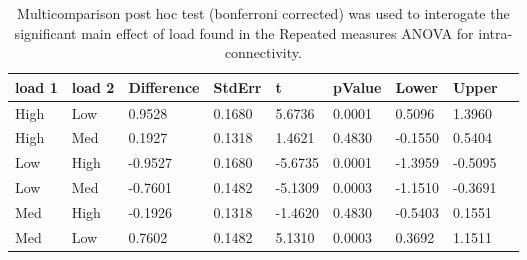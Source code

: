 \begin{table}
\centering
\begin{tabular}[0.2em]{@{}lllllllll@{}}\toprule
load 1 & load 2 & Difference & StdErr & t & pValue & Lower & Upper\\\toprule[0.2em]
High & Low & 0.9528 & 0.1680 & 5.6736 & 0.0001 & 0.5096 & 1.3960 \\\midrule
High & Med & 0.1927 & 0.1318 & 1.4621 & 0.4830 & -0.1550 & 0.5404 \\\midrule
Low & High & -0.9527 & 0.1680 & -5.6735 & 0.0001 & -1.3959 & -0.5095 \\\midrule
Low & Med & -0.7601 & 0.1482 & -5.1309 & 0.0003 & -1.1510 & -0.3691 \\\midrule
Med & High & -0.1926 & 0.1318 & -1.4620 & 0.4830 & -0.5403 & 0.1551 \\\midrule
Med & Low & 0.7602 & 0.1482 & 5.1310 & 0.0003 & 0.3692 & 1.1511 \\\bottomrule[0.2em]
\end{tabular}
\caption{Multicomparison post hoc test (bonferroni corrected) was used to interogate the significant main effect of load found in the Repeated measures ANOVA for intra-connectivity.\label{tabel:tbl_RMABA1_PH_load}}
\end{table}
